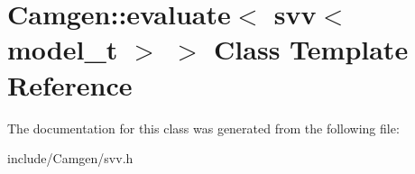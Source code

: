 \hypertarget{a00200}{}\section{Camgen\+:\+:evaluate$<$ svv$<$ model\+\_\+t $>$ $>$ Class Template Reference}
\label{a00200}


The documentation for this class was generated from the following file\+:\begin{DoxyCompactItemize}
\item 
include/\+Camgen/svv.\+h\end{DoxyCompactItemize}
